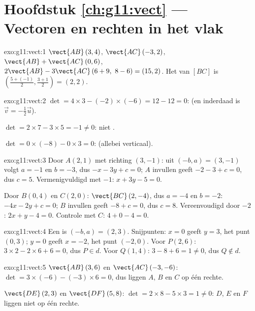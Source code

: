 \section*{Hoofdstuk \ref{ch:g11:vect} --- Vectoren en rechten in het vlak}

\begin{solution}{exo:g11:vect:1}
$\vect{AB}\,(3, 4)$, $\vect{AC}\,(-3, 2)$,
$\vect{AB} + \vect{AC}\,(0, 6)$,
$2\vect{AB} - 3\vect{AC}\,(6 + 9,\ 8 - 6) = (15, 2)$. Het  van $[BC]$
is $\left(\frac{5 + (-1)}{2}, \frac{3+1}{2}\right) = (2, 2)$.
\end{solution}

\begin{solution}{exo:g11:vect:2}
$\det = 4 \times 3 - (-2) \times (-6) = 12 - 12 = 0$:  (en
inderdaad is $\vec v = -\frac12 \vec u$).

$\det = 2 \times 7 - 3 \times 5 = -1 \neq 0$: niet .

$\det = 0 \times (-8) - 0 \times 3 = 0$:  (allebei verticaal).
\end{solution}

\begin{solution}{exo:g11:vect:3}
Door $A(2,1)$ met richting $(3, -1)$: uit $(-b, a) = (3, -1)$ volgt
$a = -1$ en $b = -3$, dus $-x - 3y + c = 0$; $A$ invullen geeft
$-2 - 3 + c = 0$, dus $c = 5$. Vermenigvuldigd met $-1$: $x + 3y - 5 = 0$.

Door $B(0,4)$ en $C(2,0)$: $\vect{BC}\,(2, -4)$, dus $a = -4$ en $b = -2$:
$-4x - 2y + c = 0$; $B$ invullen geeft $-8 + c = 0$, dus $c = 8$.
Vereenvoudigd door $-2$: $2x + y - 4 = 0$. Controle met $C$:
$4 + 0 - 4 = 0$.
\end{solution}

\begin{solution}{exo:g11:vect:4}
Een  is $(-b, a) = (2, 3)$. Snijpunten: $x = 0$ geeft
$y = 3$, het punt $(0, 3)$; $y = 0$ geeft $x = -2$, het punt $(-2, 0)$. Voor
$P(2,6)$: $3 \times 2 - 2 \times 6 + 6 = 0$, dus $P \in d$. Voor $Q(1,4)$:
$3 - 8 + 6 = 1 \neq 0$, dus $Q \notin d$.
\end{solution}

\begin{solution}{exo:g11:vect:5}
$\vect{AB}\,(3, 6)$ en $\vect{AC}\,(-3, -6)$:
$\det = 3 \times (-6) - (-3) \times 6 = 0$, dus liggen $A$, $B$ en $C$ op
één rechte.

$\vect{DE}\,(2, 3)$ en $\vect{DF}\,(5, 8)$:
$\det = 2 \times 8 - 5 \times 3 = 1 \neq 0$: $D$, $E$ en $F$ liggen niet op
één rechte.
\end{solution}

